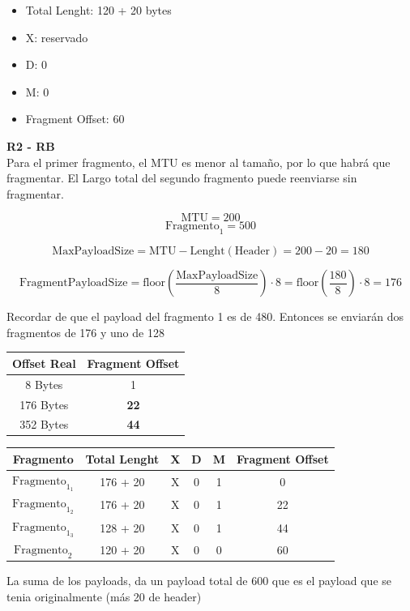 \begin{itemize}
    \item Total Lenght: 120 + 20 bytes
    \item X: reservado
    \item D: 0
    \item M: 0
    \item Fragment Offset: 60
\end{itemize}


\textbf{R2 - RB}\\

Para el primer fragmento, el MTU es menor al tamaño, por lo que habrá que fragmentar. El Largo total del segundo fragmento puede reenviarse sin fragmentar.


$$ \mathrm{MTU} = 200 $$
$$ \mathrm{Fragmento}_1 = 500 $$

$$ \mathrm{MaxPayloadSize} = \mathrm{MTU} - \mathrm{Lenght}(\mathrm{Header}) = 200 - 20 = 180 $$

$$ \mathrm{FragmentPayloadSize} = \mathrm{floor}(\frac{\mathrm{MaxPayloadSize}}{8}) \cdot 8 = \mathrm{floor}(\frac{\mathrm{180}}{8}) \cdot 8  = 176 $$

Recordar de que el payload del fragmento 1 es de 480. Entonces se enviarán dos fragmentos de 176 y uno de 128

\begin{center}
    \begin{tabular}{c|c}
        Offset Real & Fragment Offset \\
        \hline
        \hline
        8 Bytes & 1 \\
        \hline
        176 Bytes & \textbf{22} \\
        \hline
        352 Bytes & \textbf{44}
    \end{tabular}
\end{center}

\begin{center}
    \begin{tabular}{c|c|c|c|c|c}
    Fragmento & Total Lenght & X & D & M & Fragment Offset \\
        \hline
        \hline
    $ \mathrm{Fragmento}_{1_1} $  &  176 + 20  & X & 0 & 1 & 0   \\
    \hline
    $ \mathrm{Fragmento}_{1_2} $  &  176 + 20  & X & 0 & 1 & 22 \\
    \hline
    $ \mathrm{Fragmento}_{1_3} $ &  128 + 20  & X & 0 & 1 & 44 \\
    \hline
    $ \mathrm{Fragmento}_{2} $  & 120 + 20 & X & 0 & 0 & 60
    \end{tabular}
\end{center}

La suma de los payloads, da un payload total de 600 que es el payload que se tenia originalmente (más 20 de header)


